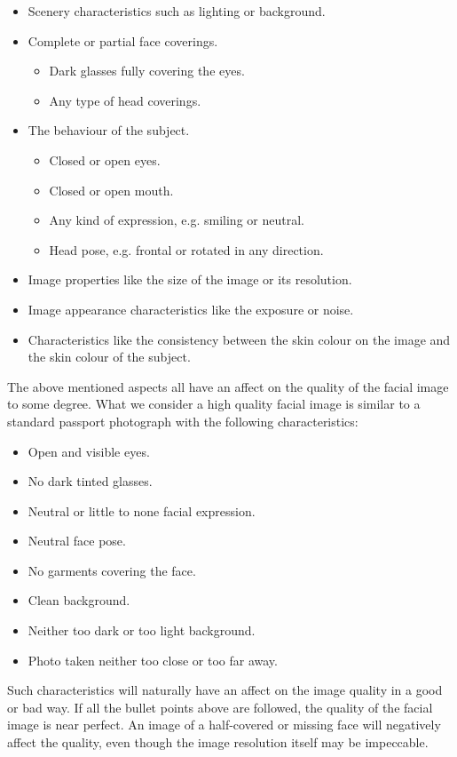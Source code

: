 \begin{itemize}
    \item Scenery characteristics such as lighting or background.
    \item Complete or partial face coverings.
    \begin{itemize}
        \item Dark glasses fully covering the eyes.
        \item Any type of head coverings.
    \end{itemize}
    \item The behaviour of the subject.
    \begin{itemize}
        \item Closed or open eyes.
        \item Closed or open mouth.
        \item Any kind of expression, e.g. smiling or neutral.
        \item Head pose, e.g. frontal or rotated in any direction.
    \end{itemize}
    \item Image properties like the size of the image or its resolution.
    \item Image appearance characteristics like the exposure or noise.
    \item Characteristics like the consistency between the skin colour on the image and the skin colour of the subject.
\end{itemize}
%
The above mentioned aspects all have an affect on the quality of the facial image to some degree. What we consider a high quality facial image is similar to a standard passport photograph with the following characteristics: 
\begin{itemize}
    \item Open and visible eyes.
    \item No dark tinted glasses. 
    \item Neutral or little to none facial expression.
    \item Neutral face pose.
    \item No garments covering the face.
    \item Clean background.
    \item Neither too dark or too light background.
    \item Photo taken neither too close or too far away.
\end{itemize}
%
Such characteristics will naturally have an affect on the image quality in a good or bad way. If all the bullet points above are followed, the quality of the facial image is near perfect. An image of a half-covered or missing face will negatively affect the quality, even though the image resolution itself may be impeccable. 
